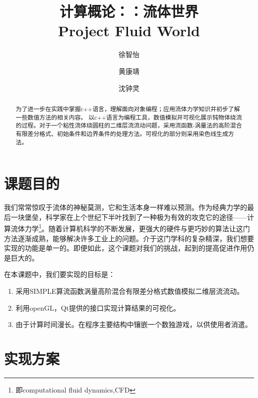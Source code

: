 \documentclass[12pt]{article}
\title{计算概论：：流体世界\\ Project Fluid World}
\author{徐智怡 \and 黄康靖 \and 沈钟灵}
\date{}
\begin{document}
\maketitle
\begin{abstract}
为了进一步在实践中掌握c++语言，理解面向对象编程；应用流体力学知识并初步了解一些数值方法的相关内容。
以c++语言为编程工具，数值模拟并可视化展示钝物体绕流的过程。对于一个粘性流体绕圆柱的二维层流流动问题，采用流函数-涡量法的高阶混合有限差分格式、初始条件和边界条件的处理方法。可视化的部分则采用染色线生成方法。\end{abstract}
\tableofcontents
\newpage
\section{课题目的}
我们常常惊叹于流体的神秘莫测，它和生活本身一样难以预测。作为经典力学的最后一块堡垒，科学家在上个世纪下半叶找到了一种极为有效的攻克它的途径——计算流体力学\footnote{即computational fluid dynamics,CFD}。随着计算机科学的不断发展，更强大的硬件与更巧妙的算法让这门方法逐渐成熟，能够解决许多工业上的问题。介于这门学科的复杂精深，我们想要实现的功能是单一的。即便如此，这个课题对我们的挑战，起到的提高促进作用仍是巨大的。

在本课题中，我们要实现的目标是：
\begin{enumerate}
\item 采用SIMPLE算流函数涡量高阶混合有限差分格式数值模拟二维层流流动。
\item 利用openGL，Qt提供的接口实现计算结果的可视化。
\item 由于计算时间漫长。在程序主要结构中镶嵌一个数独游戏，以供使用者消遣。
\end{enumerate}

\section{实现方案}
\end{document}
